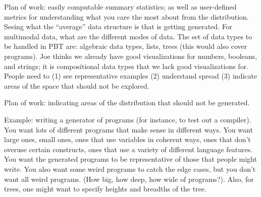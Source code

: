 


Plan of work: easily computable summary statistics; as well as user-defined metrics for understanding what you care the most about from the distribution. Seeing what the “average” data structure is that is getting generated. For multimodal data, what are the different modes of data. The set of data types to be handled in PBT are: algebraic data types, lists, trees (this would also cover programs). Joe thinks we already have good visualizations for numbers, booleans, and strings; it is compositional data types that we lack good visualizations for. People need to (1) see representative examples (2) understand spread (3) indicate areas of the space that should not be explored.  


Plan of work: indicating areas of the distribution that should not be generated.

Example: writing a generator of programs (for instance, to test out a compiler). You want lots of different programs that make sense in different ways. You want large ones, small ones, ones that use variables in coherent ways, ones that don’t overuse certain constructs, ones that use a variety of different language features. You want the generated programs to be representative of those that people might write. You also want some weird programs to catch the edge cases, but you don’t want all weird programs. (How big, how deep, how wide of programs?). Also, for trees, one might want to specify heights and breadths of the tree.


